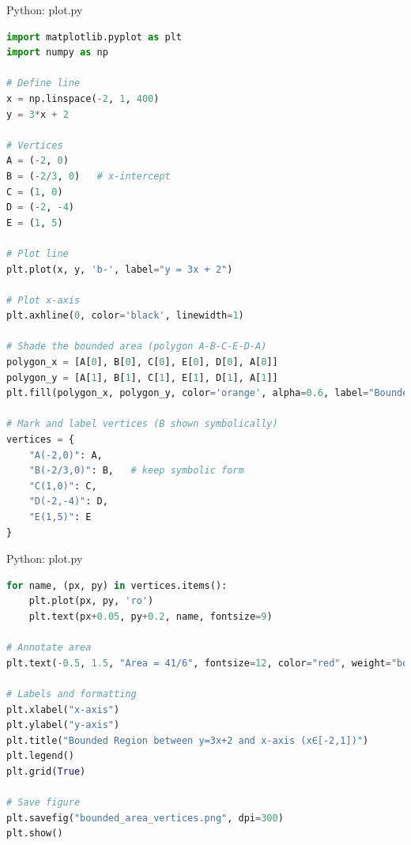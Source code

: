 \documentclass{beamer}
\numberwithin{equation}{section}
\theoremstyle{remark}
\begin{document}
\begin{frame}[fragile]{Python: plot.py}
\begin{lstlisting}[language=Python]
 import matplotlib.pyplot as plt
import numpy as np

# Define line
x = np.linspace(-2, 1, 400)
y = 3*x + 2

# Vertices
A = (-2, 0)
B = (-2/3, 0)   # x-intercept
C = (1, 0)
D = (-2, -4)
E = (1, 5)

# Plot line
plt.plot(x, y, 'b-', label="y = 3x + 2")

# Plot x-axis
plt.axhline(0, color='black', linewidth=1)

# Shade the bounded area (polygon A-B-C-E-D-A)
polygon_x = [A[0], B[0], C[0], E[0], D[0], A[0]]
polygon_y = [A[1], B[1], C[1], E[1], D[1], A[1]]
plt.fill(polygon_x, polygon_y, color='orange', alpha=0.6, label="Bounded Area")

# Mark and label vertices (B shown symbolically)
vertices = {
    "A(-2,0)": A,
    "B(-2/3,0)": B,   # keep symbolic form
    "C(1,0)": C,
    "D(-2,-4)": D,
    "E(1,5)": E
}
\end{lstlisting}
\end{frame} 

\begin{frame}[fragile]{Python: plot.py}
\begin{lstlisting}[language=Python]
for name, (px, py) in vertices.items():
    plt.plot(px, py, 'ro')
    plt.text(px+0.05, py+0.2, name, fontsize=9)

# Annotate area
plt.text(-0.5, 1.5, "Area = 41/6", fontsize=12, color="red", weight="bold")

# Labels and formatting
plt.xlabel("x-axis")
plt.ylabel("y-axis")
plt.title("Bounded Region between y=3x+2 and x-axis (x∈[-2,1])")
plt.legend()
plt.grid(True)

# Save figure
plt.savefig("bounded_area_vertices.png", dpi=300)
plt.show()
\end{lstlisting}
\end{frame} 
\end{document}

